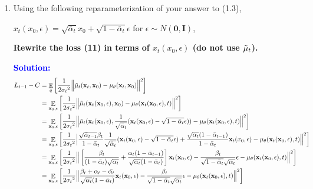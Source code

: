 \documentclass{article}
\DeclareMathOperator{\EX}{\mathbb{E}}%
\begin{document}
\begin{enumerate}
    \item 
    Using the following reparameterization of your answer to (1.3), 
    
    ${x_t}(x_0, \epsilon) = \sqrt{\bar\alpha_t}x_0 + \sqrt{1 - \bar\alpha_t}\epsilon $  for $\epsilon \sim N(\boldsymbol{0}, \boldsymbol{I})$, 
    
    \textbf{Rewrite the loss (11) in terms of ${x_t}(x_0, \epsilon)$ (do not use $\Tilde\mu_t$).}

\textcolor{blue}{
    \textbf{Solution: } 
    \begin{align*}
    L_{t-1} - C &= \EX_q\left[\frac{1}{2{\sigma_t}^2}
    \Big\lVert{\Tilde\mu_t}(\textbf{x}_t, \textbf{x}_0) - {\mu_\theta}(\textbf{x}_t, \textbf{x}_0)\Big\rVert^2\right] \\
    &= \EX_{\textbf{x}_0, \epsilon}\left[\frac{1}{2{\sigma_t}^2}
    \Big\lVert{\Tilde\mu_t}(\textbf{x}_t(\textbf{x}_0, \epsilon), \textbf{x}_0) - {\mu_\theta}(\textbf{x}_t(\textbf{x}_0, \epsilon), t)\Big\rVert^2\right] \\
    &= \EX_{\textbf{x}_0, \epsilon}\left[\frac{1}{2{\sigma_t}^2}
    \Big\lVert{\Tilde\mu_t}(\textbf{x}_t(\textbf{x}_0, \epsilon), \frac{1}{\sqrt{\Bar{\alpha}_t}}(\textbf{x}_t(\textbf{x}_0, \epsilon) - \sqrt{1 - \Bar{\alpha}_t}\epsilon)) - {\mu_\theta}(\textbf{x}_t(\textbf{x}_0, \epsilon), t)\Big\lVert^2\right] \\
    &= \EX_{\textbf{x}_0, \epsilon}\left[\frac{1}{2{\sigma_t}^2}
    \Big\lvert \frac{\sqrt{\Bar{\alpha}_{t-1}}\beta_t}{1 - \Bar{\alpha}_t}\frac{1}{\sqrt{\Bar{\alpha}_t}}(\textbf{x}_t(\textbf{x}_0, \epsilon) - \sqrt{1 - \Bar{\alpha}_t}\epsilon) + \frac{\sqrt{\alpha_t}(1 - \Bar{\alpha}_{t-1})}{1 - \Bar{\alpha}_t}\textbf{x}_t(x_0, \epsilon) - {\mu_\theta}(\textbf{x}_t(\textbf{x}_0, \epsilon), t)\Big\rVert^2\right]\\
    &= \EX_{\textbf{x}_0, \epsilon}\left[\frac{1}{2{\sigma_t}^2}
    \Big\lVert \left[\frac{\beta_t}{(1 - \Bar{\alpha}_t)\sqrt{\alpha_t}} + \frac{\alpha_t(1 - \Bar{\alpha}_{t - 1})}{\sqrt{\alpha_t}(1 - \Bar{\alpha}_t)}\right]\textbf{x}_t(\textbf{x}_0, \epsilon) - \frac{\beta_t}{\sqrt{1 - \Bar{\alpha}_t}\sqrt{\alpha_t}}\epsilon - {\mu_\theta}(\textbf{x}_t(\textbf{x}_0, \epsilon), t)\Big\rVert^2\right]\\
    &= \EX_{\textbf{x}_0, \epsilon}\left[\frac{1}{2{\sigma_t}^2}
    \Big\lVert \frac{\beta_t + \alpha_t - \Bar{\alpha_t}}{\sqrt{\alpha_t}(1 - \Bar{\alpha}_t)}\textbf{x}_t(\textbf{x}_0, \epsilon) - \frac{\beta_t}{\sqrt{1 - \Bar{\alpha}_t}\sqrt{\alpha_t}}\epsilon - {\mu_\theta}(\textbf{x}_t(\textbf{x}_0, \epsilon), t)\Big\rVert^2\right]\\

\end{align*}}
\end{enumerate}
\end{document}
